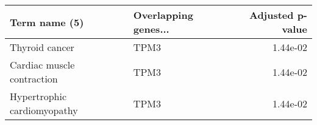 \begin{tabular}{llr}
\toprule
              Term name (5) & Overlapping genes... &  Adjusted p-value \\
\midrule
             Thyroid cancer &                 TPM3 &          1.44e-02 \\
 Cardiac muscle contraction &                 TPM3 &          1.44e-02 \\
Hypertrophic cardiomyopathy &                 TPM3 &          1.44e-02 \\
\bottomrule
\end{tabular}
